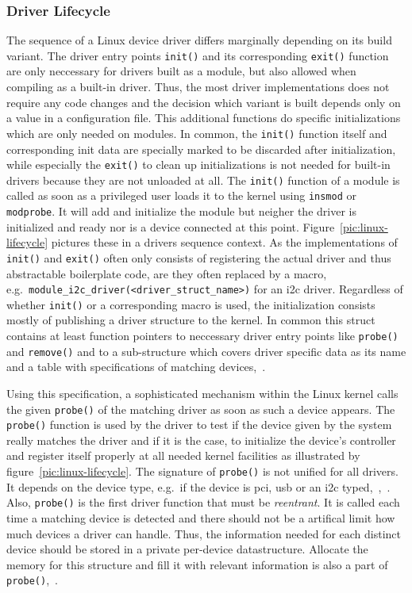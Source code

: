 \subsubsection*{Driver Lifecycle}
The sequence of a Linux device driver differs marginally depending on its build variant.
The driver entry points \texttt{init()} and its corresponding \texttt{exit()} function are only neccessary for drivers built as a module, but also allowed when compiling as a built-in driver.
Thus, the most driver implementations does not require any code changes and the decision which variant is built depends only on a value in a configuration file.
This additional functions do specific initializations which are only needed on modules.
In common, the \texttt{init()} function itself and corresponding init data are specially marked to be discarded after initialization, while especially the \texttt{exit()} to clean up initializations is not needed for built-in drivers because they are not unloaded at all\cite{lfd430}.
The \texttt{init()} function of a module is called as soon as a privileged user loads it to the kernel using \texttt{insmod} or \texttt{modprobe}.
It will add and initialize the module but neigher the driver is initialized and ready nor is a device connected at this point.
Figure~\ref{pic:linux-lifecycle} pictures these in a drivers sequence context.
As the implementations of \texttt{init()} and \texttt{exit()} often only consists of registering the actual driver and thus abstractable boilerplate code, are they often replaced by a macro, e.g.\ \texttt{module\_i2c\_driver(<driver\_struct\_name>)} for an \ac{i2c} driver.
Regardless of whether \texttt{init()} or a corresponding macro is used, the initialization consists mostly of publishing a driver structure to the kernel.
In common this struct contains at least function pointers to neccessary driver entry points like \texttt{probe()} and \texttt{remove()} and to a sub-structure which covers driver specific data as its name and a table with specifications of matching devices\cite{quade2016Linux},~\cite{lfd430}. 

Using this specification, a sophisticated mechanism within the Linux kernel calls the given \texttt{probe()} of the matching driver as soon as such a device appears.
The \texttt{probe()} function is used by the driver to test if the device given by the system really matches the driver and if it is the case, to initialize the device's controller and register itself properly at all needed kernel facilities as illustrated by figure~\ref{pic:linux-lifecycle}.
The signature of \texttt{probe()} is not unified for all drivers.
It depends on the device type, e.g.\ if the device is \ac{pci}, \ac{usb} or an \ac{i2c} typed\cite{lfd430},~\cite{quade2016Linux},~\cite{corbet2005linux}.
Also, \texttt{probe()} is the first driver function that must be \textit{reentrant}.
It is called each time a matching device is detected and there should not be a artifical limit how much devices a driver can handle. 
Thus, the information needed for each distinct device should be stored in a private per-device datastructure.
Allocate the memory for this structure and fill it with relevant information is also a part of \texttt{probe()}\cite{lfd430},~\cite{quade2016Linux}.

